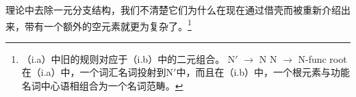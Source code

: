 理论中去除一元分支结构，我们不清楚它们为什么在现在通过借壳而被重新介绍出来，带有一个额外的空元素就更为复杂了。\footnote{%
（i.a）中旧的\xbarc 规则对应于（i.b）中的二元组合。
\eal
\ex N$'$ $\to$ N
\ex N $\to$ N-func root 
\zl
在（i.a）中，一个词汇名词投射到N$'$中，而且在（i.b）中，一个根元素与功能名词中心语相组合为一个名词范畴。
}
